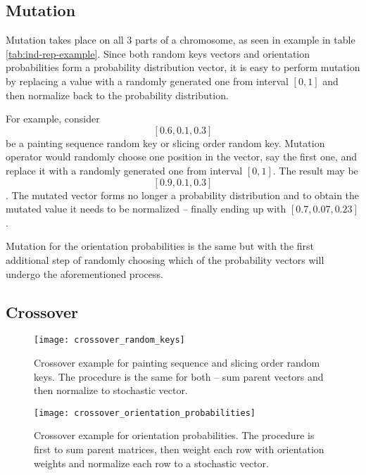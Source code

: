 \subsection{Mutation}\label{subsec:mutation}
Mutation takes place on all 3 parts of a chromosome, as seen in example in table \ref{tab:ind-rep-example}.
Since both random keys vectors and orientation probabilities form a probability distribution vector,
it is easy to perform mutation by replacing a value with a randomly generated one from interval $[0,1]$
and then normalize back to the probability distribution.

For example, consider $$[0.6, 0.1, 0.3]$$ be a painting sequence random key or slicing order random key.
Mutation operator would randomly choose one position in the vector, say the first one, and replace it
with a randomly generated one from interval $[0,1]$. The result may be $$[0.9, 0.1, 0.3]$$.
The mutated vector forms no longer a probability distribution and to obtain the mutated value
it needs to be normalized – finally ending up with $[0.7, 0.07, 0.23]$.

Mutation for the orientation probabilities is the same but with the first additional
step of randomly choosing which of the probability vectors will undergo the aforementioned process.

\subsection{Crossover}\label{subsec:crossover}

\begin{figure}[htp]
    \texttt{[image: crossover\_random\_keys]}\caption{
        Crossover example for painting sequence and slicing order random keys.
        The procedure is the same for both – sum parent vectors and then normalize to stochastic vector.
    }
    \label{fig:crossover-random-keys}
\end{figure}

\begin{figure}[htp]
    \texttt{[image: crossover\_orientation\_probabilities]}\caption{
        Crossover example for orientation probabilities. The procedure is first to sum parent matrices,
        then weight each row with orientation weights and normalize each row to a stochastic vector.}
    \label{fit:crossover-orientation-probabilities}
\end{figure}


